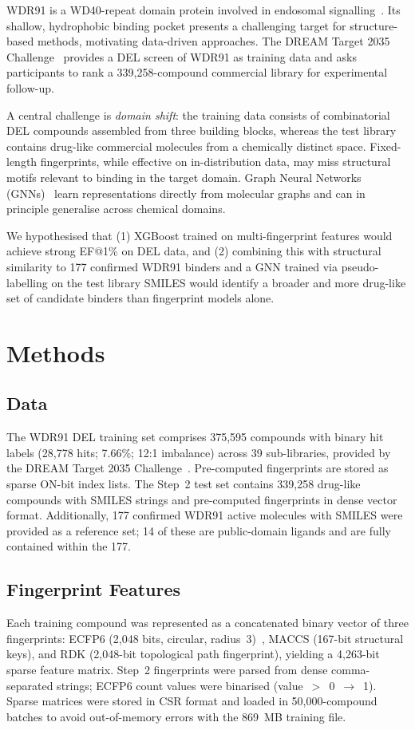 \documentclass[10pt, letterpaper]{article}
\begin{document}
WDR91 is a WD40-repeat domain protein involved in endosomal signalling~\cite{Jia2016}. Its shallow, hydrophobic binding pocket presents a challenging target for structure-based methods, motivating data-driven approaches. The DREAM Target 2035 Challenge~\cite{DREAM2035} provides a DEL screen of WDR91 as training data and asks participants to rank a 339,258-compound commercial library for experimental follow-up.

A central challenge is \emph{domain shift}: the training data consists of combinatorial DEL compounds assembled from three building blocks, whereas the test library contains drug-like commercial molecules from a chemically distinct space. Fixed-length fingerprints, while effective on in-distribution data, may miss structural motifs relevant to binding in the target domain. Graph Neural Networks (GNNs)~\cite{Gilmer2017} learn representations directly from molecular graphs and can in principle generalise across chemical domains.

We hypothesised that (1) XGBoost trained on multi-fingerprint features would achieve strong EF@1\% on DEL data, and (2) combining this with structural similarity to 177 confirmed WDR91 binders and a GNN trained via pseudo-labelling on the test library SMILES would identify a broader and more drug-like set of candidate binders than fingerprint models alone.

\section{Methods}

\subsection{Data}
The WDR91 DEL training set comprises 375,595 compounds with binary hit labels (28,778 hits; 7.66\%; 12:1 imbalance) across 39 sub-libraries, provided by the DREAM Target 2035 Challenge~\cite{DREAM2035}. Pre-computed fingerprints are stored as sparse ON-bit index lists. The Step~2 test set contains 339,258 drug-like compounds with SMILES strings and pre-computed fingerprints in dense vector format. Additionally, 177 confirmed WDR91 active molecules with SMILES were provided as a reference set; 14 of these are public-domain ligands and are fully contained within the 177.

\subsection{Fingerprint Features}
Each training compound was represented as a concatenated binary vector of three fingerprints: ECFP6 (2,048 bits, circular, radius~3)~\cite{Rogers2010}, MACCS (167-bit structural keys), and RDK (2,048-bit topological path fingerprint), yielding a 4,263-bit sparse feature matrix. Step~2 fingerprints were parsed from dense comma-separated strings; ECFP6 count values were binarised (value~$>$~0~$\rightarrow$~1). Sparse matrices were stored in CSR format and loaded in 50,000-compound batches to avoid out-of-memory errors with the 869~MB training file.
\end{document}
